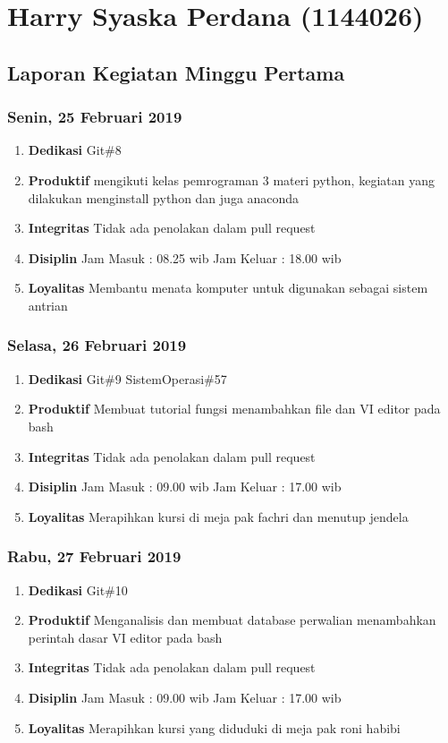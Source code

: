\chapter{Harry Syaska Perdana (1144026)}
\section{Laporan Kegiatan Minggu Pertama}
\subsection{Senin, 25 Februari 2019}
\begin{enumerate}
\item \textbf{Dedikasi}
\subitem Git\#8
\item \textbf{Produktif}
\subitem mengikuti kelas pemrograman 3 materi python, kegiatan yang dilakukan menginstall python dan juga anaconda
\item \textbf{Integritas}
\subitem Tidak ada penolakan dalam pull request
\item \textbf{Disiplin}
\subitem Jam Masuk : 08.25 wib
\subitem Jam Keluar : 18.00 wib
\item \textbf{Loyalitas}
\subitem Membantu menata komputer untuk digunakan sebagai sistem antrian
\end{enumerate}

\subsection{Selasa, 26 Februari 2019}
\begin{enumerate}
\item \textbf{Dedikasi}
\subitem Git\#9
\subitem SistemOperasi\#57
\item \textbf{Produktif}
\subitem Membuat tutorial fungsi menambahkan file dan VI editor pada bash
\item \textbf{Integritas}
\subitem Tidak ada penolakan dalam pull request
\item \textbf{Disiplin}
\subitem Jam Masuk : 09.00 wib
\subitem Jam Keluar : 17.00 wib
\item \textbf{Loyalitas}
\subitem Merapihkan kursi di meja pak fachri dan menutup jendela
\end{enumerate}

\subsection{Rabu, 27 Februari 2019}
\begin{enumerate}
\item \textbf{Dedikasi}
\subitem Git\#10
\item \textbf{Produktif}
\subitem Menganalisis dan membuat database perwalian
\subitem menambahkan perintah dasar VI editor pada bash 
\item \textbf{Integritas}
\subitem Tidak ada penolakan dalam pull request
\item \textbf{Disiplin}
\subitem Jam Masuk : 09.00 wib
\subitem Jam Keluar : 17.00 wib
\item \textbf{Loyalitas}
\subitem Merapihkan kursi yang diduduki di meja pak roni habibi
\end{enumerate}

